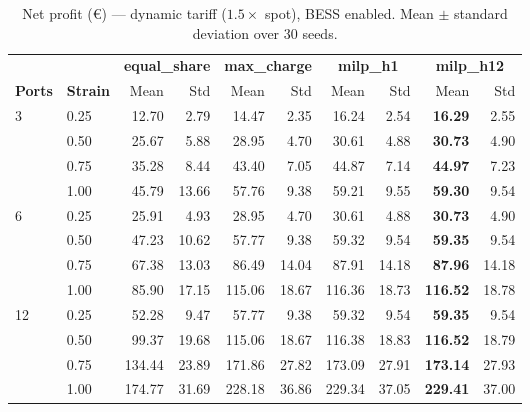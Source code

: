\begin{table}[!htb]
\centering
\caption{Net profit (€) — dynamic tariff ($1.5\times$ spot), BESS enabled.
         Mean $\pm$ standard deviation over 30 seeds.}
\label{tab:gc_dynamic_bess_profit}
\setlength{\tabcolsep}{4.5pt}
\begin{tabular}{ll rrrrrrrr}
\toprule
 & & \multicolumn{2}{c}{\textbf{equal\_share}}
   & \multicolumn{2}{c}{\textbf{max\_charge}}
   & \multicolumn{2}{c}{\textbf{milp\_h1}}
   & \multicolumn{2}{c}{\textbf{milp\_h12}} \\
\cmidrule(lr){3-4}\cmidrule(lr){5-6}\cmidrule(lr){7-8}\cmidrule(lr){9-10}
\textbf{Ports} & \textbf{Strain} &
  Mean & Std & Mean & Std & Mean & Std & Mean & Std \\
\midrule
\multirow{4}{*}{3}
  & 0.25 &  12.70 &  2.79 &  14.47 &  2.35 &  16.24 &  2.54 & \textbf{16.29} &  2.55 \\
  & 0.50 &  25.67 &  5.88 &  28.95 &  4.70 &  30.61 &  4.88 & \textbf{30.73} &  4.90 \\
  & 0.75 &  35.28 &  8.44 &  43.40 &  7.05 &  44.87 &  7.14 & \textbf{44.97} &  7.23 \\
  & 1.00 &  45.79 & 13.66 &  57.76 &  9.38 &  59.21 &  9.55 & \textbf{59.30} &  9.54 \\
\midrule
\multirow{4}{*}{6}
  & 0.25 &  25.91 &  4.93 &  28.95 &  4.70 &  30.61 &  4.88 & \textbf{30.73} &  4.90 \\
  & 0.50 &  47.23 & 10.62 &  57.77 &  9.38 &  59.32 &  9.54 & \textbf{59.35} &  9.54 \\
  & 0.75 &  67.38 & 13.03 &  86.49 & 14.04 &  87.91 & 14.18 & \textbf{87.96} & 14.18 \\
  & 1.00 &  85.90 & 17.15 & 115.06 & 18.67 & 116.36 & 18.73 & \textbf{116.52} & 18.78 \\
\midrule
\multirow{4}{*}{12}
  & 0.25 &  52.28 &  9.47 &  57.77 &  9.38 &  59.32 &  9.54 & \textbf{59.35} &  9.54 \\
  & 0.50 &  99.37 & 19.68 & 115.06 & 18.67 & 116.38 & 18.83 & \textbf{116.52} & 18.79 \\
  & 0.75 & 134.44 & 23.89 & 171.86 & 27.82 & 173.09 & 27.91 & \textbf{173.14} & 27.93 \\
  & 1.00 & 174.77 & 31.69 & 228.18 & 36.86 & 229.34 & 37.05 & \textbf{229.41} & 37.00 \\
\bottomrule
\end{tabular}
\end{table}

